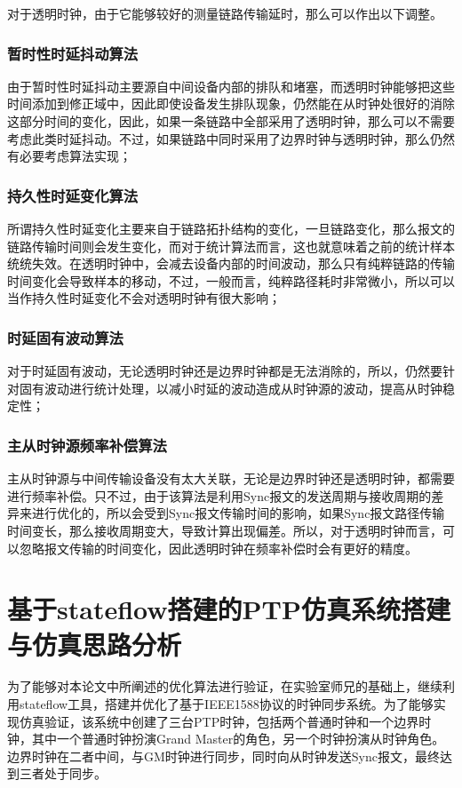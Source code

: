 对于透明时钟，由于它能够较好的测量链路传输延时，那么可以作出以下调整。
\subsubsection{暂时性时延抖动算法}
由于暂时性时延抖动主要源自中间设备内部的排队和堵塞，而透明时钟能够把这些时间添加到修正域中，因此即使设备发生排队现象，仍然能在从时钟处很好的消除这部分时间的变化，因此，如果一条链路中全部采用了透明时钟，那么可以不需要考虑此类时延抖动。不过，如果链路中同时采用了边界时钟与透明时钟，那么仍然有必要考虑算法实现；

\subsubsection{持久性时延变化算法}
所谓持久性时延变化主要来自于链路拓扑结构的变化，一旦链路变化，那么报文的链路传输时间则会发生变化，而对于统计算法而言，这也就意味着之前的统计样本统统失效。在透明时钟中，会减去设备内部的时间波动，那么只有纯粹链路的传输时间变化会导致样本的移动，不过，一般而言，纯粹路径耗时非常微小，所以可以当作持久性时延变化不会对透明时钟有很大影响；

\subsubsection{时延固有波动算法}
对于时延固有波动，无论透明时钟还是边界时钟都是无法消除的，所以，仍然要针对固有波动进行统计处理，以减小时延的波动造成从时钟源的波动，提高从时钟稳定性；

\subsubsection{主从时钟源频率补偿算法}
主从时钟源与中间传输设备没有太大关联，无论是边界时钟还是透明时钟，都需要进行频率补偿。只不过，由于该算法是利用Sync报文的发送周期与接收周期的差异来进行优化的，所以会受到Sync报文传输时间的影响，如果Sync报文路径传输时间变长，那么接收周期变大，导致计算出现偏差。所以，对于透明时钟而言，可以忽略报文传输的时间变化，因此透明时钟在频率补偿时会有更好的精度。

\section{基于stateflow搭建的PTP仿真系统搭建与仿真思路分析}
为了能够对本论文中所阐述的优化算法进行验证，在实验室师兄的基础上，继续利用stateflow工具，搭建并优化了基于IEEE1588协议的时钟同步系统。为了能够实现仿真验证，该系统中创建了三台PTP时钟，包括两个普通时钟和一个边界时钟，其中一个普通时钟扮演Grand Master的角色，另一个时钟扮演从时钟角色。边界时钟在二者中间，与GM时钟进行同步，同时向从时钟发送Sync报文，最终达到三者处于同步。

